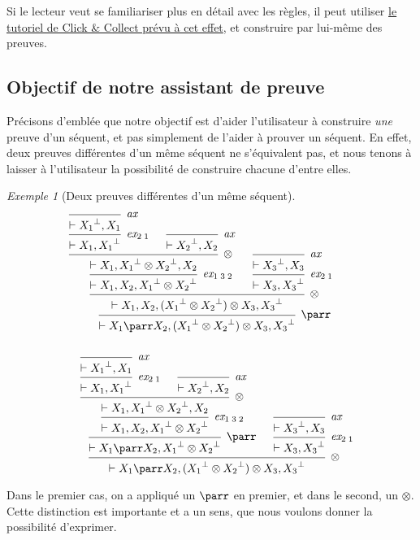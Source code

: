 \documentclass[11pt,a4paper]{article}
\theoremstyle{plain}
\theoremstyle{definition}
\theoremstyle{remark}
\newtheorem{example}{Exemple}
\newcommand*{\orth}{^\perp}
\newcommand*{\tensor}{\otimes}
\newcommand*{\axv}[1]{\infer{0}[\ensuremath{\mathit{ax}}]{\vdash #1}}
\newcommand*{\tensorv}[1]{\infer{2}[\ensuremath{\tensor}]{\vdash #1}}
\newcommand*{\parrv}[1]{\infer{1}[\ensuremath{\parr}]{\vdash #1}}
\newcommand*{\permv}[2]{\infer{1}[\ensuremath{\textit{ex}_{#1}}]{\vdash #2}}
\begin{document}
Si le lecteur veut se familiariser plus en détail avec les règles, il peut utiliser \href{https://click-and-collect.linear-logic.org/#tutorial}{le tutoriel de Click \& Collect prévu à cet effet}, et construire par lui-même des preuves.

\subsection{Objectif de notre assistant de preuve}
Précisons d'emblée que notre objectif est d'aider l'utilisateur à construire \textit{une} preuve d'un séquent, et pas simplement de l'aider à prouver un séquent. En effet, deux preuves différentes d'un même séquent ne s'équivalent pas, et nous tenons à laisser à l'utilisateur la possibilité de construire chacune d'entre elles.

\begin{example}[Deux preuves différentes d'un même séquent]
    \begin{align*}
    \begin{multlined}
        \begin{prooftree}
                 \axv{{X_1}\orth, X_1}
                 \permv{2 \;1}{X_1, {X_1}\orth}
                 \axv{{X_2}\orth, X_2}
              \tensorv{X_1, {X_1}\orth \tensor {X_2}\orth, X_2}
              \permv{1 \;3 \;2}{X_1, X_2, {X_1}\orth \tensor {X_2}\orth}
              \axv{{X_3}\orth, X_3}
              \permv{2 \;1}{X_3, {X_3}\orth}
           \tensorv{X_1, X_2, ({X_1}\orth \tensor {X_2}\orth) \tensor X_3, {X_3}\orth}
        \parrv{X_1 \parr X_2, ({X_1}\orth \tensor {X_2}\orth) \tensor X_3, {X_3}\orth}
        \end{prooftree} \\ \\
        \begin{prooftree}
                 \axv{{X_1}\orth, X_1}
                 \permv{2 \;1}{X_1, {X_1}\orth}
                 \axv{{X_2}\orth, X_2}
              \tensorv{X_1, {X_1}\orth \tensor {X_2}\orth, X_2}
              \permv{1 \;3 \;2}{X_1, X_2, {X_1}\orth \tensor {X_2}\orth}
           \parrv{X_1 \parr X_2, {X_1}\orth \tensor {X_2}\orth}
           \axv{{X_3}\orth, X_3}
           \permv{2 \;1}{X_3, {X_3}\orth}
        \tensorv{X_1 \parr X_2, ({X_1}\orth \tensor {X_2}\orth) \tensor X_3, {X_3}\orth}
        \end{prooftree}
    \end{multlined}
    \end{align*}
    
    Dans le premier cas, on a appliqué un $\parr$ en premier, et dans le second, un $\tensor$. Cette distinction est importante et a un sens, que nous voulons donner la possibilité d'exprimer.
\end{example}
\end{document}

